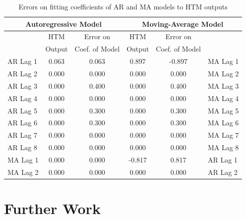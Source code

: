 \documentclass[oneside,12pt,openany]{book}
\begin{document}
	
	\begin{table}[]
		\centering
		\begin{tabular}{|l|c|c|c|c|l|}
			\hline
			\multicolumn{3}{|c|}{Autoregressive Model} & \multicolumn{3}{c|}{Moving-Average Model} \\ \hline
			\cellcolor{black} & HTM & Error on & HTM & Error on & \cellcolor{black} \\
			\cellcolor{black} & Output & Coef. of Model & Output & Coef. of Model & \cellcolor{black} \\ \hline
			AR Lag 1 & 0.063 & 0.063 & 0.897 & -0.897 & MA Lag 1 \\ \hline
			AR Lag 2 & 0.000 & 0.000 & 0.000 & 0.000 & MA Lag 2 \\ \hline
			AR Lag 3 & 0.000 & 0.400 & 0.000 & 0.400 & MA Lag 3 \\ \hline
			AR Lag 4 & 0.000 & 0.000 & 0.000 & 0.000 & MA Lag 4 \\ \hline
			AR Lag 5 & 0.000 & 0.300 & 0.000 & 0.300 & MA Lag 5 \\ \hline
			AR Lag 6 & 0.000 & 0.300 & 0.000 & 0.300 & MA Lag 6 \\ \hline
			AR Lag 7 & 0.000 & 0.000 & 0.000 & 0.000 & MA Lag 7 \\ \hline
			AR Lag 8 & 0.000 & 0.000 & 0.000 & 0.000 & MA Lag 8 \\ \hline
			MA Lag 1 & 0.000 & 0.000 & -0.817 & 0.817 & AR Lag 1 \\ \hline
			MA Lag 2 & 0.000 & 0.000 & 0.000 & 0.000 & AR Lag 2 \\ \hline
		\end{tabular}
		\label{tab:HTMARMAError}
		\caption{Errors on fitting coefficients of AR and MA models to HTM outputs}
	\end{table}

	
	
	\chapter{Further Work}
	
	
	
	\nocite{*}  %
	{}
	
	\appendices
\end{document}
